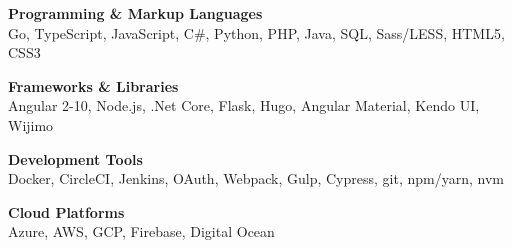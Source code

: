 

\begin{cvparagraph}

    \textbf{Programming \& Markup Languages}\\
    Go, TypeScript, JavaScript, C\#, Python, PHP, Java, SQL, Sass/LESS, HTML5, CSS3

    \textbf{Frameworks \& Libraries}\\
    Angular 2-10, Node.js, .Net Core, Flask, Hugo, Angular Material, Kendo UI, Wijimo

    \textbf{Development Tools}\\
    Docker, CircleCI, Jenkins, OAuth, Webpack, Gulp, Cypress, git, npm/yarn, nvm

    \textbf{Cloud Platforms}\\
    Azure, AWS, GCP, Firebase, Digital Ocean
\end{cvparagraph}
